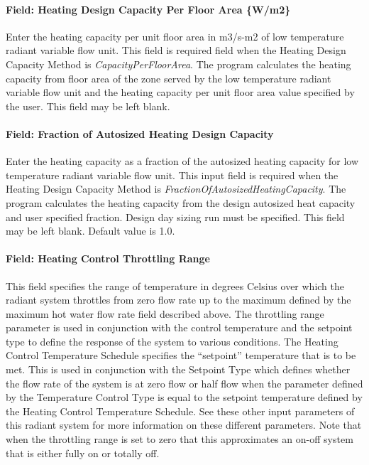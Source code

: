 \paragraph{Field: Heating Design Capacity Per Floor Area \{W/m2\}}\label{field-heating-design-capacity-per-floor-area-wm2-5}

Enter the heating capacity per unit floor area in m3/s-m2 of low temperature radiant variable flow unit. This field is required field when the Heating Design Capacity Method is \emph{CapacityPerFloorArea}. The program calculates the heating capacity from floor area of the zone served by the low temperature radiant variable flow unit and the heating capacity per unit floor area value specified by the user. This field may be left blank.

\paragraph{Field: Fraction of Autosized Heating Design Capacity}\label{field-fraction-of-autosized-heating-design-capacity-5}

Enter the heating capacity as a fraction of the autosized heating capacity for low temperature radiant variable flow unit. This input field is required when the Heating Design Capacity Method is \emph{FractionOfAutosizedHeatingCapacity}. The program calculates the heating capacity from the design autosized heat capacity and user specified fraction. Design day sizing run must be specified. This field may be left blank. Default value is 1.0.

\paragraph{Field: Heating Control Throttling Range}\label{field-heating-control-throttling-range}

This field specifies the range of temperature in degrees Celsius over which the radiant system throttles from zero flow rate up to the maximum defined by the maximum hot water flow rate field described above. The throttling range parameter is used in conjunction with the control temperature and the setpoint type to define the response of the system to various conditions. The Heating Control Temperature Schedule specifies the ``setpoint'' temperature that is to be met.  This is used in conjunction with the Setpoint Type which defines whether the flow rate of the system is at zero flow or half flow when the parameter defined by the Temperature Control Type is equal to the setpoint temperature defined by the Heating Control Temperature Schedule.  See these other input parameters of this radiant system for more information on these different parameters.  Note that when the throttling range is set to zero that this approximates an on-off system that is either fully on or totally off.

